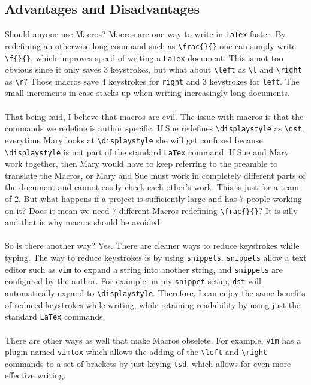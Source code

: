 \documentclass[a4paper, 12pt]{report}
\begin{document}
\begin{center}
\subsection{Advantages and Disadvantages}
\begin{comment}
\end{comment}
Should anyone use Macros? Macros are one way to write in \texttt{LaTex} faster. By redefining an otherwise long command such as \texttt{\textbackslash frac\{\}\{\}} one can simply write \texttt{\textbackslash f\{\}\{\}}, which improves speed of writing a \texttt{LaTex} document. This is not too obvious since it only saves $3$ keystrokes, but what about \texttt{\textbackslash left} as \texttt{\textbackslash l}  and \texttt{\textbackslash right} as \texttt{\textbackslash r}? Those macros save $4$ keystrokes for \texttt{right} and $3$ keystrokes for \texttt{left}. The small increments in ease stacks up when writing increasingly long documents.
\\~\\That being said, I believe that macros are evil. The issue with macros is that the commands we redefine is author specific. If Sue redefines \texttt{\textbackslash displaystyle} as \texttt{\textbackslash dst}, everytime Mary looks at \texttt{\textbackslash displaystyle} she will get confused because \texttt{\textbackslash displaystyle} is not part of the standard \texttt{LaTex} command. If Sue and Mary work together, then Mary would have to keep referring to the preamble to translate the Macros, or Mary and Sue must work in completely different parts of the document and cannot easily check each other's work. This is just for a team of $2$. But what happens if a project is sufficiently large and has $7$ people working on it? Does it mean we need $7$ different Macros redefining \texttt{\textbackslash frac\{\}\{\}}? It is silly and that is why macros should be avoided.
\\~\\So is there another way? Yes. There are cleaner ways to reduce keystrokes while typing. The way to reduce keystrokes is by using \texttt{snippets}. \texttt{snippets} allow a text editor such as \texttt{vim} to expand a string into another string, and \texttt{snippets} are configured by the author. For example, in my \texttt{snippet} setup, \texttt{dst} will automatically expand to \texttt{\textbackslash displaystyle}. Therefore, I can enjoy the same benefits of reduced keystrokes while writing, while retaining readability by using just the standard \texttt{LaTex} commands.
\\~\\There are other ways as well that make Macros obselete. For example, \texttt{vim} has a plugin named \texttt{vimtex} which allows the adding of the \texttt{\textbackslash left} and \texttt{\textbackslash right} commands to a set of brackets by just keying \texttt{tsd}, which allows for even more effective writing.


\end{center}
\end{document}
